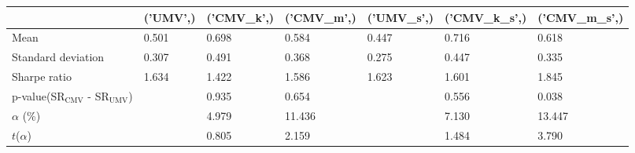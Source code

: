 \begin{tabular}{lllllll}
\toprule
 & ('UMV',) & ('CMV_k',) & ('CMV_m',) & ('UMV_s',) & ('CMV_k_s',) & ('CMV_m_s',) \\
\midrule
Mean & 0.501 & 0.698 & 0.584 & 0.447 & 0.716 & 0.618 \\
Standard deviation & 0.307 & 0.491 & 0.368 & 0.275 & 0.447 & 0.335 \\
Sharpe ratio & 1.634 & 1.422 & 1.586 & 1.623 & 1.601 & 1.845 \\
p-value(SR$_{\text{CMV}}$ - SR$_{\text{UMV}}$) &  & 0.935 & 0.654 &  & 0.556 & 0.038 \\
$\alpha$ (\%) &  & 4.979 & 11.436 &  & 7.130 & 13.447 \\
$t$($\alpha$) &  & 0.805 & 2.159 &  & 1.484 & 3.790 \\
\bottomrule
\end{tabular}
